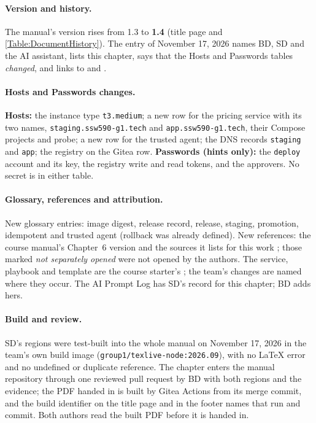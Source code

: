 \paragraph{Version and history.} The manual's version rises from 1.3 to \textbf{1.4} (title page and \ref{Table:DocumentHistory}). The entry of November 17, 2026 names BD, SD and the AI assistant, lists this chapter, says that the Hosts and Passwords tables \emph{changed},
and links to  and .

\paragraph{Hosts and Passwords changes.} \textbf{Hosts:} the instance type \texttt{t3.medium}; a new row for the pricing service with its two names, \texttt{staging.ssw590-g1.tech} and \texttt{app.ssw590-g1.tech}, their Compose projects and probe; a new row for the trusted agent;
the DNS records \texttt{staging} and \texttt{app}; the registry on the Gitea row. \textbf{Passwords (hints only):} the \texttt{deploy} account and its key, the registry write and read tokens, and the approvers. No secret is in either table.

\paragraph{Glossary, references and attribution.} New glossary entries: image digest, release record, release, staging, promotion, idempotent and trusted agent (rollback was already defined). New references: the course manual's Chapter~6 version \cite{DosManualV143} and the sources it lists for this work
\cite{AnsibleGettingStarted,AnsibleBecome,DockerBuildBestPractices,DockerCompose,DockerEngineSecurity,GiteaContainerRegistry,JenkinsPipelineSyntax,FlaskDeploying}; those marked \emph{not separately opened} were not opened by the authors.
The service, playbook and template are the course starter's \cite{DosManualV143}; the team's changes are named where they occur. The AI Prompt Log has SD's record for this chapter; BD adds hers.

\paragraph{Build and review.} SD's regions were test-built into the whole manual on November 17, 2026 in the team's own build image (\texttt{group1/texlive-node:2026.09}), with no LaTeX error and no undefined or duplicate reference. The chapter enters the manual repository through one reviewed pull request by BD
with both regions and the evidence; the PDF handed in is built by Gitea Actions from its merge commit, and the build identifier on the title page and in the footer names that run and commit. Both authors read the built PDF before it is handed in.
